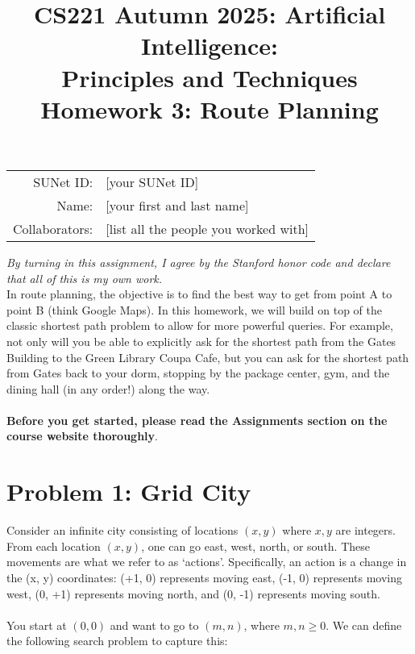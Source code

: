 \documentclass{article}
\title{\textbf{CS221 Autumn 2025: Artificial Intelligence:\\ Principles and Techniques} \\Homework 3: Route Planning}
\date{}
\theoremstyle{case}
\theoremstyle{definition}
\begin{document}
\maketitle

\begin{center}
\begin{tabular}{rl}
SUNet ID: & [your SUNet ID] \\
Name: & [your first and last name] \\
Collaborators: & [list all the people you worked with]
\end{tabular}
\end{center}
\textit{By turning in this assignment, I agree by the Stanford honor code and declare
that all of this is my own work.} \\
\fontsize{12pt}{16pt}\selectfont
In route planning, the objective is to find the best way to get from point A to point B (think Google Maps).
  In this homework, we will build on top of the classic shortest path problem to allow for more powerful queries. For
  example, not only will you be able to explicitly ask for the shortest path from the Gates Building to the Green Library Coupa Cafe, but you can ask for the shortest path from Gates back to your dorm, stopping by the package center,
  gym, and the dining hall (in any order!) along the way. \\
  \\
\textbf{Before you get started, please read the Assignments section on the course website thoroughly}.


\section*{Problem 1: Grid City}

Consider an infinite city consisting of locations $(x,y)$ where $x, y$ are integers.
  From each location $(x,y)$, one can go east, west, north, or south.
  These movements are what we refer to as ‘actions’.
  Specifically, an action is a change in the (x, y) coordinates: (+1, 0) represents moving east, (-1, 0)
  represents moving west, (0, +1) represents moving north, and (0, -1) represents moving south.
  \\
  \\
  You start at $(0,0)$ and want to go to $(m, n)$, where $m, n \geq 0$.
  We can define the following search problem to capture this:
\end{document}
